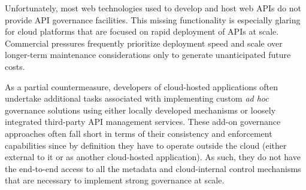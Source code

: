 Unfortunately, most web technologies used to develop and host web APIs do not 
provide API governance facilities. This missing functionality is
especially glaring
for cloud platforms that are focused on rapid
deployment of APIs at scale.   Commercial pressures frequently prioritize
deployment speed and scale over longer-term maintenance considerations only to
generate unanticipated future costs.

As a partial countermeasure, developers of cloud-hosted applications often 
undertake additional tasks associated with 
implementing custom {\em ad hoc} governance solutions using either locally
developed mechanisms or loosely integrated
third-party API management services. 
These add-on governance
approaches often fall short in terms of their consistency and enforcement
capabilities since
by definition they have to operate outside the
cloud (either external to it or as another cloud-hosted application). 
As such, they do not have the end-to-end 
access to all the metadata and cloud-internal control mechanisms
that are necessary to implement strong governance at scale. 
